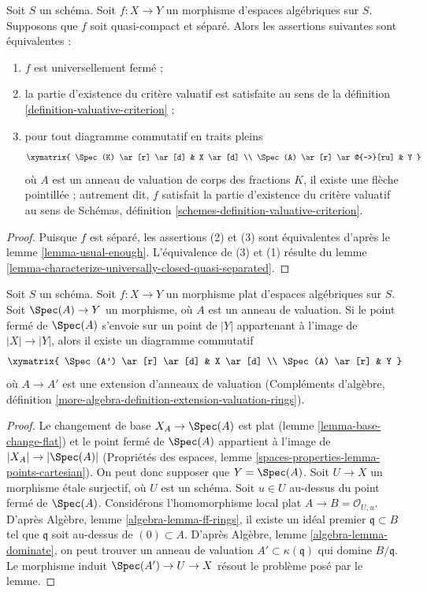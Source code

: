 \begin{lemma}
\label{lemma-characterize-universally-closed-separated}
Soit $S$ un schéma. Soit $f : X \to Y$ un morphisme d'espaces algébriques
sur $S$. Supposons que $f$ soit quasi-compact et séparé. Alors les assertions suivantes
sont équivalentes :
\begin{enumerate}
\item $f$ est universellement fermé ;
\item la partie d'existence du critère valuatif est satisfaite
au sens de la définition \ref{definition-valuative-criterion} ;
\item pour tout diagramme commutatif en traits pleins
$$
\xymatrix{
\Spec(K) \ar[r] \ar[d] & X \ar[d] \\
\Spec(A) \ar[r] \ar@{-->}[ru] & Y
}
$$
où $A$ est un anneau de valuation de corps des fractions $K$, il existe
une flèche pointillée ; autrement dit, $f$ satisfait la partie d'existence du critère
valuatif au sens de
Schémas, définition \ref{schemes-definition-valuative-criterion}.
\end{enumerate}
\end{lemma}

\begin{proof}
Puisque $f$ est séparé, les assertions (2) et (3) sont équivalentes d'après le
lemme \ref{lemma-usual-enough}.
L'équivalence de (3) et (1) résulte du
lemme \ref{lemma-characterize-universally-closed-quasi-separated}.
\end{proof}

\begin{lemma}
\label{lemma-lift-valuation-ring-through-flat-morphism}
Soit $S$ un schéma. Soit $f : X \to Y$ un morphisme plat
d'espaces algébriques sur $S$.
Soit $\Spec(A) \to Y$ un morphisme, où $A$ est un
anneau de valuation. Si le point fermé de $\Spec(A)$ s'envoie sur un
point de $|Y|$ appartenant à l'image de $|X| \to |Y|$, alors il existe
un diagramme commutatif
$$
\xymatrix{
\Spec(A') \ar[r] \ar[d] & X \ar[d] \\
\Spec(A) \ar[r] & Y
}
$$
où $A \to A'$ est une extension d'anneaux de valuation
(Compléments d'algèbre, définition
\ref{more-algebra-definition-extension-valuation-rings}).
\end{lemma}

\begin{proof}
Le changement de base $X_A \to \Spec(A)$ est plat
(lemme \ref{lemma-base-change-flat}) et le point fermé de
$\Spec(A)$ appartient à l'image de $|X_A| \to |\Spec(A)|$
(Propriétés des espaces, lemme \ref{spaces-properties-lemma-points-cartesian}).
On peut donc supposer que $Y = \Spec(A)$. Soit $U \to X$ un morphisme
étale surjectif, où $U$ est un schéma. Soit $u \in U$ au-dessus
du point fermé de $\Spec(A)$. Considérons l'homomorphisme local plat
$A \to B = \mathcal{O}_{U, u}$. D'après
Algèbre, lemme \ref{algebra-lemma-ff-rings},
il existe un idéal premier $\mathfrak q \subset B$ tel que
$\mathfrak q$ soit au-dessus de $(0) \subset A$. D'après
Algèbre, lemme \ref{algebra-lemma-dominate},
on peut trouver un anneau de valuation $A' \subset \kappa(\mathfrak q)$
qui domine $B/\mathfrak q$. Le morphisme induit
$\Spec(A') \to U \to X$ résout le problème
posé par le lemme.
\end{proof}


